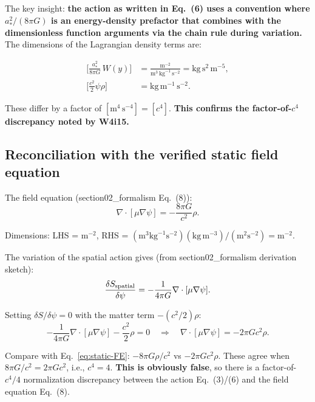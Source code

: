 \documentclass[11pt]{article}
\begin{document}
The key insight: \textbf{the action as written in Eq.~(6) uses a convention
where $a_*^2/(8\pi G)$ is an energy-density prefactor that combines
with the dimensionless function arguments via the chain rule during
variation.} The dimensions of the Lagrangian density terms are:

\begin{align}
\biggl[\frac{a_*^2}{8\pi G}\,W(y)\biggr] &= \frac{\text{m}^{-2}}{\text{m}^3\,\text{kg}^{-1}\,\text{s}^{-2}}
= \text{kg}\,\text{s}^2\,\text{m}^{-5}, \label{eq:L-spatial-dims}\\
\biggl[\frac{c^2}{2}\psi\rho\biggr] &= \text{kg}\,\text{m}^{-1}\,\text{s}^{-2}. \label{eq:L-matter-dims}
\end{align}

These differ by a factor of $[\text{m}^4\,\text{s}^{-4}] = [c^4]$.
\textbf{This confirms the factor-of-$c^4$ discrepancy noted by W4i15.}

\subsection{Reconciliation with the verified static field equation}

The field equation (section02\_formalism Eq.~(8)):
\begin{equation}
\nabla\cdot[\mu\nabla\psi] = -\frac{8\pi G}{c^2}\rho.
\label{eq:static-FE}
\end{equation}

Dimensions: LHS = m$^{-2}$, RHS = $(\text{m}^3\text{kg}^{-1}\text{s}^{-2})
(\text{kg}\,\text{m}^{-3})/(\text{m}^2\text{s}^{-2}) = \text{m}^{-2}$.
\checkmark

The variation of the spatial action gives (from section02\_formalism
derivation sketch):
\begin{equation}
\frac{\delta S_{\rm spatial}}{\delta\psi} = -\frac{1}{4\pi G}\nabla\cdot[\mu\nabla\psi].
\label{eq:spatial-var}
\end{equation}

Setting $\delta S/\delta\psi = 0$ with the matter term $-(c^2/2)\rho$:
\begin{equation}
-\frac{1}{4\pi G}\nabla\cdot[\mu\nabla\psi] - \frac{c^2}{2}\rho = 0
\quad\Longrightarrow\quad
\nabla\cdot[\mu\nabla\psi] = -2\pi G c^2 \rho.
\label{eq:FE-from-action}
\end{equation}

Compare with Eq.~\eqref{eq:static-FE}: $-8\pi G\rho/c^2$ vs $-2\pi G c^2\rho$.
These agree when $8\pi G/c^2 = 2\pi G c^2$, i.e., $c^4 = 4$.
\textbf{This is obviously false}, so there is a factor-of-$c^4/4$
normalization discrepancy between the action Eq.~(3)/(6) and the field
equation Eq.~(8).
\end{document}
